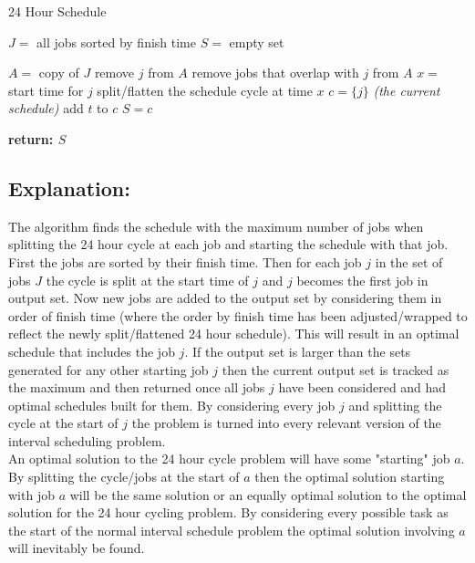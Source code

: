 \documentclass[11pt]{article}
\begin{document}
\begin{algorithm}
    \caption{24 Hour Schedule}
    \begin{algorithmic}[1]
        \STATE $J = $ all jobs sorted by finish time
        \STATE $S = $ empty set
        
            \STATE $A = $ copy of $J$
            \STATE remove $j$ from $A$
            \STATE remove jobs that overlap with $j$ from $A$
            \STATE $x = $ start time for $j$
            \STATE split/flatten the schedule cycle at time $x$
            \STATE $c = \{j\}$  \textit{(the current schedule)}
                    \STATE add $t$ to $c$
                \ENDIF
            \ENDFOR
                \STATE $S = c$
            \ENDIF
        \ENDFOR
        
        \STATE \textbf{return: $S$}
    \end{algorithmic}
\end{algorithm}

\subsection*{Explanation:}
The algorithm finds the schedule with the maximum number of jobs when splitting the 24 hour cycle at each job and starting the schedule with that job. First the jobs are sorted by their finish time. Then for each job $j$ in the set of jobs $J$ the cycle is split at the start time of $j$ and $j$ becomes the first job in output set. Now new jobs are added to the output set by considering them in order of finish time (where the order by finish time has been adjusted/wrapped to reflect the newly split/flattened 24 hour schedule). This will result in an optimal schedule that includes the job $j$. If the output set is larger than the sets generated for any other starting job $j$ then the current output set is tracked as the maximum and then returned once all jobs $j$ have been considered and had optimal schedules built for them. By considering every job $j$ and splitting the cycle at the start of $j$ the problem is turned into every relevant version of the interval scheduling problem.\\
An optimal solution to the 24 hour cycle problem will have some "starting" job $a$. By splitting the cycle/jobs at the start of $a$ then the optimal solution starting with job $a$ will be the same solution or an equally optimal solution to the optimal solution for the 24 hour cycling problem. By considering every possible task as the start of the normal interval schedule problem the optimal solution involving $a$ will inevitably be found. 
\end{document}
